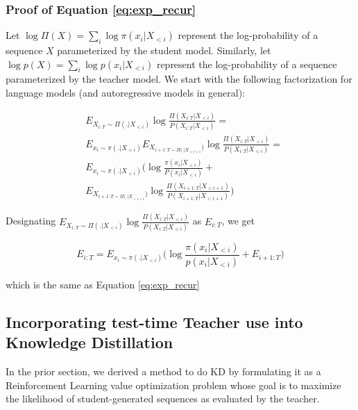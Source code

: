 \subsubsection{Proof of Equation \ref{eq:exp_recur}}

Let $\log \Pi(X) = \sum_i \log \pi(x_i|X_{<i})$ represent the log-probability of a sequence $X$ parameterized by the 
student model. Similarly, let $\log p(X) = \sum_i \log p(x_i|X_{<i})$ represent the log-probability of a sequence
parameterized by the teacher model. We start with the following factorization for language models
(and autoregressive models in general):

\begin{align}
    &E_{X_{i: T} \sim \Pi(.|X_{<i})} \log \frac{\Pi(X_{i: T}|X_{<i})}{P(X_{i: T}|X_{<i})} = \label{eq:kd_recur1} \\
    &E_{x_i \sim \pi(.|X_{<i})} E_{X_{i + 1:T \sim \Pi(.|X_{<i+1}})} \log \frac{\Pi(X_{i: T}|X_{<i})}{P(X_{i: T}|X_{<i})} = \label{eq:kd_recur2} \\
    &E_{x_i \sim \pi(.|X_{<i})} \Big(\log \frac{\pi(x_i|X_{<i})}{P(x_i|X_{<i})} + \nonumber\\
    &E_{X_{i + 1:T \sim \Pi(.|X_{<i+1}})} \log \frac{\Pi(X_{i + 1: T}|X_{<i + 1})}{P(X_{i + 1: T}|X_{<i + 1})}\Big)
\end{align}

Designating $E_{X_{i: T} \sim \Pi(.|X_{<i})} \log \frac{\Pi(X_{i: T}|X_{<i})}{P(X_{i: T}|X_{<i})}$ as $E_{i:T}$, we get

\begin{equation}
E_{i:T} = E_{x_i \sim \pi(.|X_{<i})} \Big(\log \frac{\pi(x_i|X_{<i})}{p(x_i|X_{<i})} + E_{i+1:T}\Big)
\end{equation}

which is the same as Equation \ref{eq:exp_recur}

\subsection{Incorporating test-time Teacher use into Knowledge Distillation}
\label{sec:ConstrainedKD}

In the prior section, we derived a method to do KD by formulating it as a Reinforcement Learning value optimization problem whose goal is to maximize the likelihood of student-generated sequences as evaluated by the teacher.

